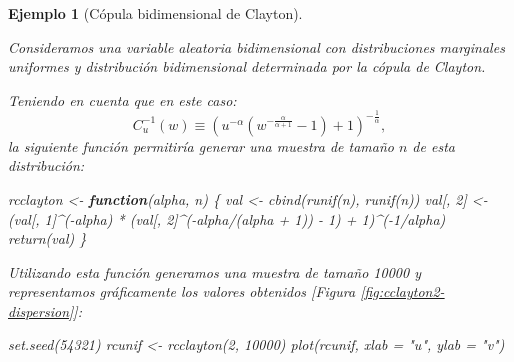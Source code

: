 \documentclass[
]{book}
\newenvironment{Shaded}{\begin{snugshade}}{\end{snugshade}}
\newcommand{\AttributeTok}[1]{\textcolor[rgb]{0.77,0.63,0.00}{#1}}
\newcommand{\ControlFlowTok}[1]{\textcolor[rgb]{0.13,0.29,0.53}{\textbf{#1}}}
\newcommand{\DecValTok}[1]{\textcolor[rgb]{0.00,0.00,0.81}{#1}}
\newcommand{\FunctionTok}[1]{\textcolor[rgb]{0.00,0.00,0.00}{#1}}
\newcommand{\NormalTok}[1]{#1}
\newcommand{\OtherTok}[1]{\textcolor[rgb]{0.56,0.35,0.01}{#1}}
\newcommand{\SpecialCharTok}[1]{\textcolor[rgb]{0.00,0.00,0.00}{#1}}
\newcommand{\StringTok}[1]{\textcolor[rgb]{0.31,0.60,0.02}{#1}}
\theoremstyle{break}
\newtheorem{example}{Ejemplo}[chapter]
\theoremstyle{nonumberplain}
\begin{document}
\begin{example}[Cópula bidimensional de Clayton]
\protect\hypertarget{exm:clayton2d}{}\label{exm:clayton2d}

Consideramos una variable aleatoria bidimensional con distribuciones marginales uniformes y distribución bidimensional determinada por la cópula de Clayton.

Teniendo en cuenta que en este caso:
\[C_{u}^{-1}(w)\equiv\left(  u^{-\alpha}\left(  
w^{-\frac{\alpha}{\alpha+1}}-1\right) + 1 \right)^{-\frac{1}{\alpha}},\]
la siguiente función permitiría generar una muestra de tamaño \(n\) de esta distribución:

\begin{Shaded}
\begin{Highlighting}[]
\NormalTok{rcclayton }\OtherTok{\textless{}{-}} \ControlFlowTok{function}\NormalTok{(alpha, n) \{}
\NormalTok{  val }\OtherTok{\textless{}{-}} \FunctionTok{cbind}\NormalTok{(}\FunctionTok{runif}\NormalTok{(n), }\FunctionTok{runif}\NormalTok{(n))}
\NormalTok{  val[, }\DecValTok{2}\NormalTok{] }\OtherTok{\textless{}{-}}\NormalTok{ (val[, }\DecValTok{1}\NormalTok{]}\SpecialCharTok{\^{}}\NormalTok{(}\SpecialCharTok{{-}}\NormalTok{alpha) }\SpecialCharTok{*} 
\NormalTok{              (val[, }\DecValTok{2}\NormalTok{]}\SpecialCharTok{\^{}}\NormalTok{(}\SpecialCharTok{{-}}\NormalTok{alpha}\SpecialCharTok{/}\NormalTok{(alpha }\SpecialCharTok{+} \DecValTok{1}\NormalTok{)) }\SpecialCharTok{{-}} \DecValTok{1}\NormalTok{) }\SpecialCharTok{+} \DecValTok{1}\NormalTok{)}\SpecialCharTok{\^{}}\NormalTok{(}\SpecialCharTok{{-}}\DecValTok{1}\SpecialCharTok{/}\NormalTok{alpha)}
  \FunctionTok{return}\NormalTok{(val)}
\NormalTok{\}}
\end{Highlighting}
\end{Shaded}

Utilizando esta función generamos una muestra de tamaño 10000 y representamos gráficamente los valores obtenidos {[}Figura \ref{fig:cclayton2-dispersion}{]}:

\begin{Shaded}
\begin{Highlighting}[]
\FunctionTok{set.seed}\NormalTok{(}\DecValTok{54321}\NormalTok{)}
\NormalTok{rcunif }\OtherTok{\textless{}{-}} \FunctionTok{rcclayton}\NormalTok{(}\DecValTok{2}\NormalTok{, }\DecValTok{10000}\NormalTok{)}
\FunctionTok{plot}\NormalTok{(rcunif, }\AttributeTok{xlab =} \StringTok{"u"}\NormalTok{, }\AttributeTok{ylab =} \StringTok{"v"}\NormalTok{)}
\end{Highlighting}
\end{Shaded}


\end{example}
\end{document}
